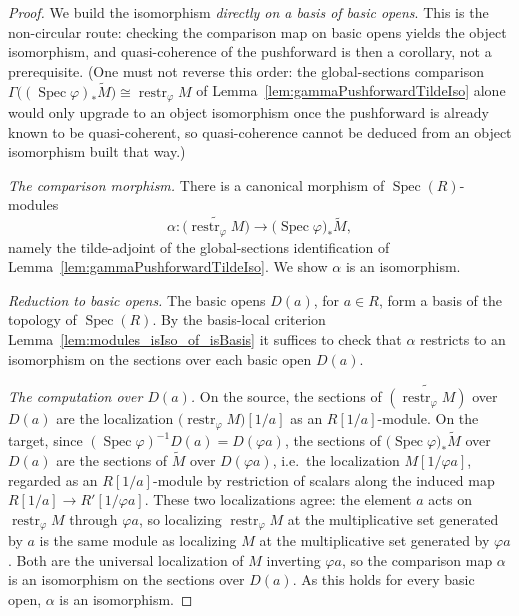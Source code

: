 \begin{proof}
  \leanok
  We build the isomorphism \emph{directly on a basis of basic opens}. This is the
  non-circular route: checking the comparison map on basic opens yields the object
  isomorphism, and quasi-coherence of the pushforward is then a corollary, not a
  prerequisite. (One must not reverse this order: the global-sections comparison
  \(\Gamma\bigl((\operatorname{Spec}\varphi)_*\widetilde{M}\bigr) \cong
  \operatorname{restr}_\varphi M\) of
  Lemma~\ref{lem:gammaPushforwardTildeIso} alone would only upgrade to an object
  isomorphism once the pushforward is already known to be quasi-coherent, so
  quasi-coherence cannot be deduced from an object isomorphism built that way.)

  \emph{The comparison morphism.} There is a canonical morphism of
  \(\operatorname{Spec}(R)\)-modules
  \[
    \alpha : \widetilde{\bigl(\operatorname{restr}_\varphi M\bigr)}
    \longrightarrow \bigl(\operatorname{Spec}\varphi\bigr)_*\widetilde{M},
  \]
  namely the tilde-adjoint of the global-sections identification of
  Lemma~\ref{lem:gammaPushforwardTildeIso}. We show \(\alpha\) is an isomorphism.

  \medskip
  \emph{Reduction to basic opens.} The basic opens \(D(a)\), for \(a \in R\), form a
  basis of the topology of \(\operatorname{Spec}(R)\). By the basis-local criterion
  Lemma~\ref{lem:modules_isIso_of_isBasis} it suffices to check that \(\alpha\)
  restricts to an isomorphism on the sections over each basic open \(D(a)\).

  \medskip
  \emph{The computation over \(D(a)\).} On the source, the sections of
  \(\widetilde{(\operatorname{restr}_\varphi M)}\) over \(D(a)\) are the
  localization \(\bigl(\operatorname{restr}_\varphi M\bigr)[1/a]\) as an
  \(R[1/a]\)-module. On the target, since \((\operatorname{Spec}\varphi)^{-1}D(a) =
  D(\varphi a)\), the sections of \(\bigl(\operatorname{Spec}\varphi\bigr)_*
  \widetilde{M}\) over \(D(a)\) are the sections of \(\widetilde{M}\) over
  \(D(\varphi a)\), i.e.\ the localization \(M[1/\varphi a]\), regarded as an
  \(R[1/a]\)-module by restriction of scalars along the induced map
  \(R[1/a] \to R'[1/\varphi a]\). These two localizations agree: the element \(a\)
  acts on \(\operatorname{restr}_\varphi M\) through \(\varphi a\), so localizing
  \(\operatorname{restr}_\varphi M\) at the multiplicative set generated by \(a\) is
  the same module as localizing \(M\) at the multiplicative set generated by
  \(\varphi a\). Both are the universal localization of
  \(M\) inverting \(\varphi a\), so the comparison map \(\alpha\) is an isomorphism
  on the sections over \(D(a)\). As this holds for every basic open, \(\alpha\) is
  an isomorphism.


\end{proof}
